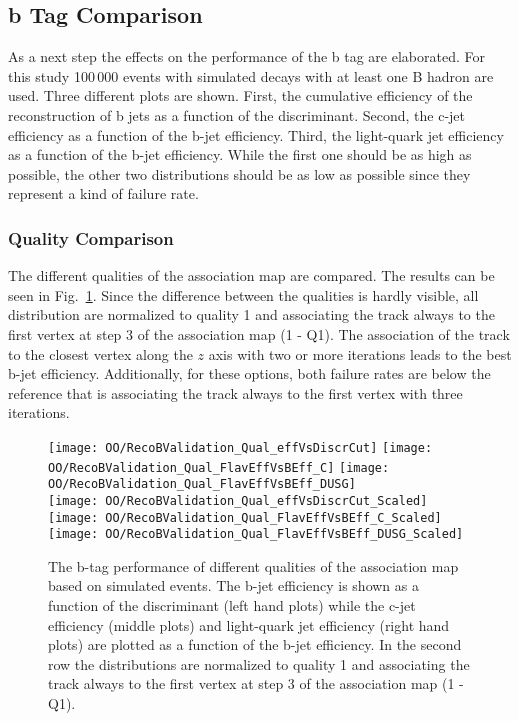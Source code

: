 \subsection{b Tag Comparison}

As a next step the effects on the performance of the b tag are elaborated. For this study 100\,000 events with simulated \ttbar decays with at least one B hadron are used. Three different plots are shown. First, the cumulative efficiency of the reconstruction of b jets as a function of the discriminant. Second, the c-jet efficiency as a function of the b-jet efficiency. Third, the light-quark jet efficiency as a function of the b-jet efficiency. While the first one should be as high as possible, the other two distributions should be as low as possible since they represent a kind of failure rate. 

\subsubsection{Quality Comparison \label{sec:OOBTaggingQual}}

The different qualities of the association map are compared. The results can be seen in Fig.~\ref{plot:OOBTaggingQual}. Since the difference between the qualities is hardly visible, all distribution are normalized to quality 1 and associating the track always to the first vertex at step 3 of the association map (1 - Q1). The association of the track to the closest vertex along the $z$ axis with two or more iterations leads to the best b-jet efficiency. Additionally, for these options, both failure rates are below the reference that is associating the track always to the first vertex with three iterations.

\begin{figure}[Ht]
  \centering
  \texttt{[image: OO/RecoBValidation\_Qual\_effVsDiscrCut]}
  \texttt{[image: OO/RecoBValidation\_Qual\_FlavEffVsBEff\_C]}
  \texttt{[image: OO/RecoBValidation\_Qual\_FlavEffVsBEff\_DUSG]}
  \\
  \texttt{[image: OO/RecoBValidation\_Qual\_effVsDiscrCut\_Scaled]}
  \texttt{[image: OO/RecoBValidation\_Qual\_FlavEffVsBEff\_C\_Scaled]}
  \texttt{[image: OO/RecoBValidation\_Qual\_FlavEffVsBEff\_DUSG\_Scaled]}
  \caption[b-tag performance of different association qualities based on simulated \ttbar events]{The b-tag performance of different qualities of the association map based on simulated \ttbar events. The b-jet efficiency is shown as a function of the discriminant (left hand plots) while the c-jet efficiency (middle plots) and light-quark jet efficiency (right hand plots) are plotted as a function of the b-jet efficiency. In the second row the distributions are normalized to quality 1 and associating the track always to the first vertex at step 3 of the association map (1 - Q1). \label{plot:OOBTaggingQual}}
\end{figure}

